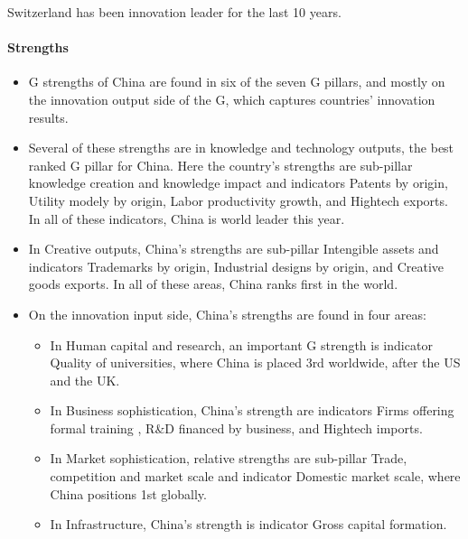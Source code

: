 Switzerland has been innovation leader for the last 10 years.

\paragraph{Strengths}

\begin{itemize}
    \item G strengths of China are found in six of the seven
        G pillars, and mostly on the innovation output side
        of the G, which captures countries' innovation results.
    \item Several of these strengths are in knowledge and technology outputs,
        the best ranked G pillar for China. Here the country's
        strengths are sub-pillar knowledge creation and knowledge impact
        and indicators Patents by origin, Utility modely by origin, Labor
        productivity growth, and Hightech exports. In all of these indicators,
        China is world leader this year.
    \item In Creative outputs, China's strengths are sub-pillar Intengible
        assets and indicators Trademarks by origin, Industrial designs by
        origin, and Creative goods exports. In all of these areas, China ranks
        first in the world.
    \item On the innovation input side, China's strengths are found in four
        areas:
        \begin{itemize}
            \item In Human capital and research, an important G
                strength is indicator Quality of universities, where China is
                placed 3rd worldwide, after the US and the UK.
            \item In Business sophistication, China's strength are indicators
                Firms offering formal training , R\&D financed by business,
                and Hightech imports.
            \item In Market sophistication, relative strengths are sub-pillar
                Trade, competition and market scale and indicator
                Domestic market scale, where China positions 1st globally.
            \item In Infrastructure, China's strength is indicator Gross capital
                formation.
        \end{itemize}
\end{itemize}

